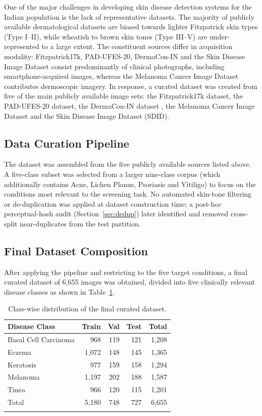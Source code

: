\documentclass[pdflatex,sn-mathphys-num]{sn-jnl}%
\begin{document}
One of the major challenges in developing skin disease detection systems for the Indian
population is the lack of representative datasets. The majority of publicly available
dermatological datasets are biased towards lighter Fitzpatrick skin types (Type I--II), while
wheatish to brown skin tones (Type III--V) are under-represented to a large extent. The
constituent sources differ in acquisition modality: Fitzpatrick17k, PAD-UFES-20, DermaCon-IN
and the Skin Disease Image Dataset consist predominantly of clinical photographs, including
smartphone-acquired images, whereas the Melanoma Cancer Image Dataset contributes dermoscopic
imagery. In response, a curated dataset was created from five of the main publicly available
image sets: the Fitzpatrick17k dataset, the PAD-UFES-20 dataset, the DermaCon-IN dataset
\cite{ref5}, the Melanoma Cancer Image Dataset and the Skin Disease Image Dataset (SDID).

\subsection{Data Curation Pipeline}

The dataset was assembled from the five publicly available sources listed above. A five-class subset was selected from a larger nine-class corpus (which additionally contains Acne, Lichen Planus, Psoriasis and Vitiligo) to focus on the conditions most relevant to the screening task. No automated skin-tone filtering or de-duplication was applied at dataset construction time; a post-hoc perceptual-hash audit (Section~\ref{sec:dedup}) later identified and removed cross-split near-duplicates from the test partition.

\subsection{Final Dataset Composition}

After applying the pipeline and restricting to the five target conditions, a final curated
dataset of 6,655 images was obtained, divided into five clinically relevant disease classes
as shown in Table~\ref{tab:dataset}.

\begin{table}[htbp]
\caption{Class-wise distribution of the final curated dataset.}\label{tab:dataset}
\begin{tabular}{@{}lrrrr@{}}
\toprule
Disease Class & Train & Val & Test & Total \\
\midrule
Basal Cell Carcinoma & 968 & 119 & 121 & 1,208 \\
Eczema & 1,072 & 148 & 145 & 1,365 \\
Keratosis & 977 & 159 & 158 & 1,294 \\
Melanoma & 1,197 & 202 & 188 & 1,587 \\
Tinea & 966 & 120 & 115 & 1,201 \\
\midrule
Total & 5,180 & 748 & 727 & 6,655 \\
\botrule
\end{tabular}
\end{table}
\end{document}
